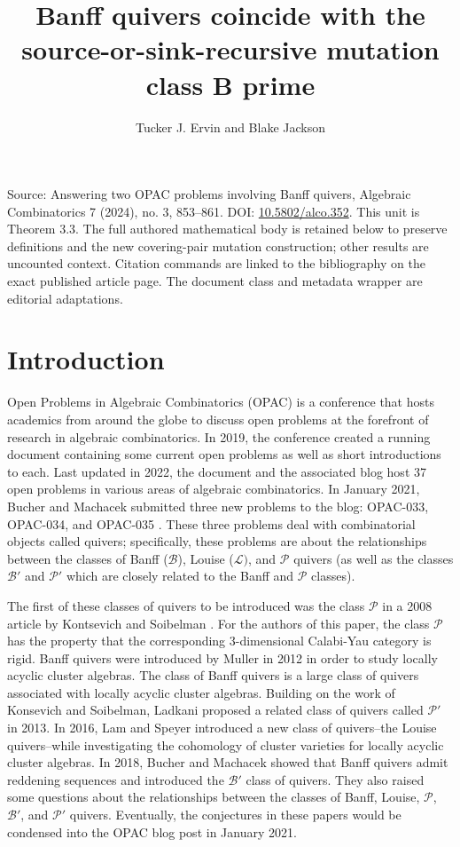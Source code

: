 \documentclass[10pt]{amsart}
\title[Human proof corpus 938]{Banff quivers coincide with the source-or-sink-recursive mutation class B prime}
\author{Tucker J. Ervin and Blake Jackson}
\theoremstyle{definition}
\theoremstyle{remark}
\newcommand{\BB}{\mathcal{B}}
\newcommand{\PP}{\mathcal{P}}
\newcommand{\LL}{\mathcal{L}}
\begin{document}
\maketitle
\noindent Source: Answering two OPAC problems involving Banff quivers, Algebraic Combinatorics 7 (2024), no. 3, 853--861. DOI: \href{https://doi.org/10.5802/alco.352}{10.5802/alco.352}. This unit is Theorem 3.3. The full authored mathematical body is retained below to preserve definitions and the new covering-pair mutation construction; other results are uncounted context. Citation commands are linked to the bibliography on the exact published article page. The document class and metadata wrapper are editorial adaptations.

\section{Introduction} \label{sec-introduction}
Open Problems in Algebraic Combinatorics (OPAC) is a conference that hosts academics from around the globe to discuss open problems at the forefront of research in algebraic combinatorics.
In 2019, the conference created a running document containing some current open problems as well as short introductions to each. 
Last updated in 2022, the document and the associated blog host 37 open problems in various areas of algebraic combinatorics. 
In January 2021, Bucher and Machacek submitted three new problems to the blog: OPAC-033, OPAC-034, and OPAC-035 \cite{bucher_banff_2021}. 
These three problems deal with combinatorial objects called quivers; specifically, these problems are about the relationships between the classes of Banff ($\BB$), Louise ($\LL)$, and $\PP$ quivers (as well as the classes $\BB'$ and $\PP'$ which are closely related to the Banff and $\PP$ classes).

The first of these classes of quivers to be introduced was the class $\mathcal{P}$ in a 2008 article by Kontsevich and Soibelman \cite{kontsevich_stability_2008}. For the authors of this paper, the class $\PP$ has the property that the corresponding 3-dimensional Calabi-Yau category is rigid. 
Banff quivers were introduced by Muller \cite{MR2995670} in 2012 in order to study locally acyclic cluster algebras. 
The class of Banff quivers is a large class of quivers associated with locally acyclic cluster algebras.
Building on the work of Konsevich and Soibelman, Ladkani \cite{ladkani_cluster_2013} proposed a related class of quivers called $\PP'$ in 2013.
In 2016, Lam and Speyer \cite{MR4384567} introduced a new class of quivers--the Louise quivers--while investigating the cohomology of cluster varieties for locally acyclic cluster algebras.
In 2018, Bucher and Machacek \cite{MR4108215} showed that Banff quivers admit reddening sequences and introduced the $\BB'$ class of quivers.
They also raised some questions about the relationships between the classes of Banff, Louise, $\PP$, $\BB'$, and $\PP'$ quivers.
Eventually, the conjectures in these papers would be condensed into the OPAC blog post in January 2021. 
\end{document}
